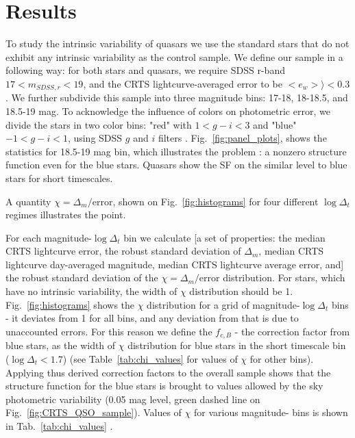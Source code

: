 \documentclass[fleqn,usenatbib]{mnras}  %
\begin{document}
\section{Results}
\label{sec:err_analysis}
To study  the intrinsic variability of quasars we use the standard stars that do not exhibit any intrinsic variability as the control sample. We define our sample in a following way: for both stars and quasars, we require SDSS  r-band $17< m_{SDSS,r} < 19$, and the CRTS lightcurve-averaged error  to be   $ <e_{w}> \rangle < 0.3$.  We further subdivide this sample into three magnitude bins: 17-18, 18-18.5, and 18.5-19 mag.   To acknowledge the influence of colors on photometric error,  we divide the stars in two color bins: "red" with   $1 < g-i < 3$ and "blue" $-1 < g-i < 1$,  using SDSS $g$ and $i$ filters .  Fig.~\ref{fig:panel_plots}, shows the statistics for 18.5-19 mag bin, which illustrates the problem : a nonzero structure function even for the blue stars. Quasars show the SF on the similar level to blue stars for short timescales.  

A quantity $\chi = \Delta_{m}/ \mathrm{error}$, shown on Fig.~\ref{fig:histograms} for four different $\log{\Delta_{t}}$ regimes illustrates the point.  


For each magnitude-$\log{\Delta_{t}}$   bin we calculate  [a set of properties: the  median CRTS lightcurve error, the robust standard deviation of $\Delta_{m}$,    median CRTS lightcurve day-averaged magnitude, median CRTS lightcurve average error, and]   the robust standard deviation of  the $\chi = \Delta_{m}/ \mathrm{error}$  distribution. For stars, which have no intrinsic variability, the width of $\chi$ distribution should be 1.  Fig.~\ref{fig:histograms}  shows the $\chi$ distribution for a grid of magnitude-$\log{\Delta_{t}}$ bins - it deviates from 1 for all bins, and any deviation from that is due to unaccounted errors. For this reason we define the $ f_{c,B}$ - the correction factor from blue stars, as the width of $\chi$ distribution for blue stars in the short timescale bin ($\log{\Delta_{t}} < 1.7$) (see Table~\ref{tab:chi_values} for values of $\chi$ for other bins). Applying thus derived correction factors to the overall sample shows that the structure function for the blue stars is brought to values allowed by the sky photometric variability (0.05 mag level, green dashed line on Fig.~\ref{fig:CRTS_QSO_sample}). Values of $\chi$ for various magnitude-  bins is shown in Tab.~\ref{tab:chi_values} . 
\end{document}
